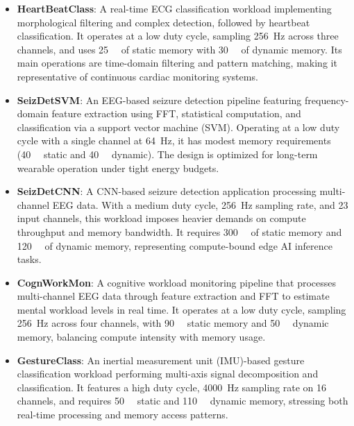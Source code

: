                 \vspace{-1em}
                \begin{itemize}
                    \item \textbf{HeartBeatClass}: A real-time ECG classification workload implementing morphological filtering and complex detection, followed by heartbeat classification. It operates at a low duty cycle, sampling \SI{256}{\hertz} across three channels, and uses \SI{25}{\kibi\byte} of static memory with \SI{30}{\kibi\byte} of dynamic memory. Its main operations are time-domain filtering and pattern matching, making it representative of continuous cardiac monitoring systems.
                
                    \item \textbf{SeizDetSVM}: An EEG-based seizure detection pipeline featuring frequency-domain feature extraction using FFT, statistical computation, and classification via a support vector machine (SVM). Operating at a low duty cycle with a single channel at \SI{64}{\hertz}, it has modest memory requirements (\SI{40}{\kibi\byte} static and \SI{40}{\kibi\byte} dynamic). The design is optimized for long-term wearable operation under tight energy budgets.
                
                    \item \textbf{SeizDetCNN}: A CNN-based seizure detection application processing multi-channel EEG data. With a medium duty cycle, \SI{256}{\hertz} sampling rate, and 23 input channels, this workload imposes heavier demands on compute throughput and memory bandwidth. It requires \SI{300}{\kibi\byte} of static memory and \SI{120}{\kibi\byte} of dynamic memory, representing compute-bound edge AI inference tasks.
                
                    \item \textbf{CognWorkMon}: A cognitive workload monitoring pipeline that processes multi-channel EEG data through feature extraction and FFT to estimate mental workload levels in real time. It operates at a low duty cycle, sampling \SI{256}{\hertz} across four channels, with \SI{90}{\kibi\byte} static memory and \SI{50}{\kibi\byte} dynamic memory, balancing compute intensity with memory usage.
                
                    \item \textbf{GestureClass}: An inertial measurement unit (IMU)-based gesture classification workload performing multi-axis signal decomposition and classification. It features a high duty cycle, \SI{4000}{\hertz} sampling rate on 16 channels, and requires \SI{50}{\kibi\byte} static and \SI{110}{\kibi\byte} dynamic memory, stressing both real-time processing and memory access patterns.
                \end{itemize}
                \vspace{-1em}

